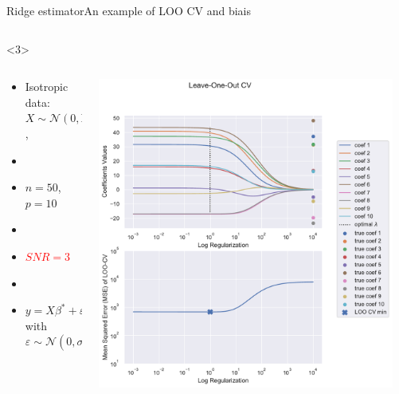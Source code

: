 \documentclass[10pt,aspectratio=43]{beamer}
\begin{document}
\begin{frame}{Ridge estimator}{An example of LOO CV and biais}
\begin{onlyenv}
\begin{columns}
\begin{column}{0.7\textwidth}
\begin{center}
                 \end{center}
            \end{column}
            \end{columns}
    \end{onlyenv}
    \begin{onlyenv}<3>
        \begin{columns}
            \begin{column}{0.4\textwidth}
                \begin{itemize}
                    \item Isotropic data: $X\sim\mathcal{N}(0,\mathrm{Id})$,
                    \item[]
                    \item $n=50$, $p=10$
                    \item[]
                    \item \textcolor{red}{$SNR=3$}
                    \item[]
                    \item $y = X\beta^*+\varepsilon$ with $\varepsilon\sim \mathcal{N}(0, \sigma^2\mathrm{Id})$
                \end{itemize}
            \end{column}
            \begin{column}{0.7\textwidth}
                \begin{center}
                        \includegraphics[width=0.95\textwidth]{path_ridge_complete_3_.pdf}

\end{center}
\end{column}
\end{columns}
\end{onlyenv}
\end{frame}
\end{document}

